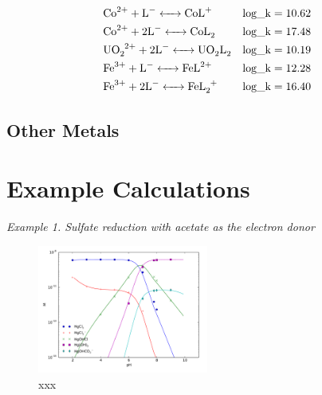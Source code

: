 \documentclass[12pt, a4paper]{article}
\begin{document}
\begin{align}
& \ce{Co^2+ + L^- <-> CoL^+} && \mathrm{log\_k} = 10.62 \\
& \ce{Co^2+ + 2 L^- <-> CoL_2} && \mathrm{log\_k} = 17.48 \\
& \ce{UO_2^2+ + 2 L^- <-> UO_2L_2} && \mathrm{log\_k} = 10.19 \\
& \ce{Fe^3+ + L^- <-> FeL^2+} && \mathrm{log\_k} = 12.28 \\
& \ce{Fe^3+ + 2 L^- <-> FeL_2^+} && \mathrm{log\_k} = 16.40
\end{align}

\subsection{Other Metals}

\section{Example Calculations}


\emph{Example 1. Sulfate reduction with acetate as the electron donor}
\\
\begin{figure}[h]
\centering
\includegraphics[width=0.5\textwidth]{../pflotran/speciation/Dong2010/ex1/comp.pdf}
\caption{xxx}
\label{Fig1}
\end{figure}
\end{document}

